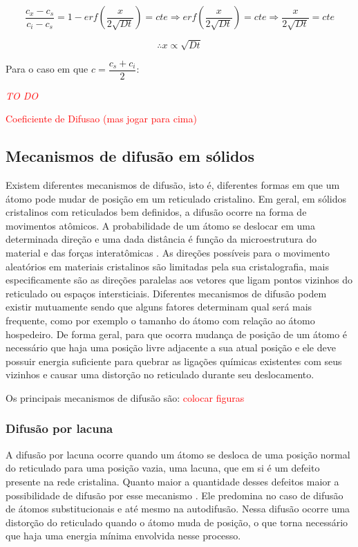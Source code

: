 \documentclass[]{politex}
\newcommand\myworries[1]{\textcolor{red}{#1}}
\begin{document}
$$\frac{c_x - c_s}{c_i - c_s} = 1 - erf(\frac{x}{2\sqrt{Dt}}) = cte \Rightarrow erf(\frac{x}{2\sqrt{Dt}}) = cte \Rightarrow \frac{x}{2\sqrt{Dt}} = cte$$

\begin{equation} \label{eq:difdist}
		\therefore x \propto  \sqrt{Dt}
\end{equation}

Para o caso em que $c = \dfrac{c_s + c_i}{2}$: \par
\myworries{\textit{TO DO}} \par
\myworries{Coeficiente de Difusao (mas jogar para cima)}


\subsection{Mecanismos de difusão em sólidos}
	Existem diferentes mecanismos de difusão, isto é, diferentes formas em que um átomo pode mudar de posição em um reticulado cristalino. Em geral, em sólidos cristalinos com reticulados bem definidos, a difusão ocorre na forma de movimentos atômicos. A probabilidade de um átomo se deslocar em uma determinada direção e uma dada distância é função da microestrutura do material e das forças interatômicas \cite{glicksman2000diffusion}.
	As direções possíveis para o movimento aleatórios em materiais cristalinos são limitadas pela sua cristalografia, mais especificamente são as direções paralelas aos vetores que ligam pontos vizinhos do reticulado ou espaços intersticiais.
	Diferentes mecanismos de difusão podem existir mutuamente sendo que alguns fatores determinam qual será mais frequente, como por exemplo o tamanho do átomo com relação ao átomo hospedeiro. De forma geral, para que ocorra mudança de posição de um átomo é necessário que haja uma posição livre adjacente a sua atual posição e ele deve possuir energia suficiente para quebrar as ligações químicas existentes com seus vizinhos e causar uma distorção no reticulado durante seu deslocamento. \par
	Os principais mecanismos de difusão são:
\myworries{colocar figuras}
\subsubsection{Difusão por lacuna}
A difusão por lacuna ocorre quando um átomo se desloca de uma posição normal do reticulado para uma posição vazia, uma lacuna, que em si é um defeito presente na rede cristalina. Quanto maior a quantidade desses defeitos maior a possibilidade de difusão por esse mecanismo \cite{callister2007materials}. Ele predomina no caso de difusão de átomos substitucionais e até mesmo na autodifusão. Nessa difusão ocorre uma distorção do reticulado quando o átomo muda de posição, o que torna necessário que haja uma energia mínima envolvida nesse processo.
\end{document}

